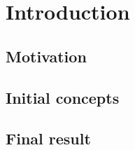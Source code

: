 \section{Introduction}

\subsection{Motivation}

\subsection{Initial concepts}

\subsection{Final result}

